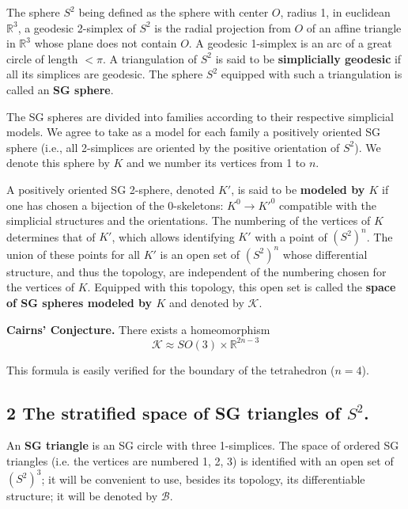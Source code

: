 \documentclass[12pt]{article}
\begin{document}
The sphere $S^2$ being defined as the sphere with center $O$, radius 1, in euclidean
$\mathbb{R}^3$, a geodesic 2-simplex of $S^2$ is the radial projection from $O$ of an affine triangle
in $\mathbb{R}^3$ whose plane does not contain $O$. A geodesic 1-simplex is an arc of a great circle
of length $< \pi$. A triangulation of $S^2$ is said to be \textbf{simplicially geodesic} if all its simplices
are geodesic. The sphere $S^2$ equipped with such a triangulation is called an \textbf{SG sphere}.

The SG spheres are divided into families according to their respective simplicial models. We agree to
take as a model for each family a positively oriented SG sphere (i.e., all 2-simplices are oriented by
the positive orientation of $S^2$). We denote this sphere by $K$ and we number its vertices from 1
to $n$.

A positively oriented SG 2-sphere, denoted $K'$, is said to be \textbf{modeled by $K$} if one has
chosen a bijection of the 0-skeletons: $K^0 \to K'^0$ compatible with the simplicial structures and
the orientations. The numbering of the vertices of $K$ determines that of $K'$, which allows
identifying $K'$ with a point of $(S^2)^n$. The union of these points for all $K'$ is an open set of
$(S^2)^n$ whose differential structure, and thus the topology, are independent of the numbering
chosen for the vertices of $K$. Equipped with this topology, this open set is called the \textbf{space
of SG spheres modeled by $K$} and denoted by $\mathcal{K}$.

\begin{center}
\textbf{Cairns' Conjecture.} There exists a homeomorphism
\begin{equation*}
\mathcal{K} \approx SO(3) \times \mathbb{R}^{2n-3}
\end{equation*}
\end{center}

This formula is easily verified for the boundary of the tetrahedron ($n=4$).

\subsection*{ 2 \textbf{The stratified space of SG triangles of $S^2$}.}

An \textbf{SG triangle} is an SG circle with three 1-simplices.
The space of ordered SG triangles (i.e. the vertices are numbered 1, 2, 3) is identified with an open
set of $(S^2)^3$; it will be convenient to use, besides its topology, its differentiable structure; it will
be denoted by $\mathcal{B}$.
\end{document}
